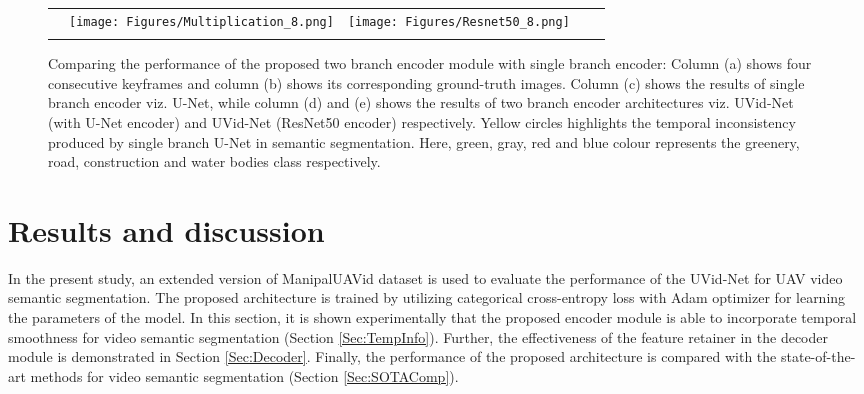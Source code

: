 \documentclass[journal]{IEEEtran}
\begin{document}
\begin{figure*}[!t]
\begin{tabular}{ccccc}
		&
		\hspace{1.4cm}
		\begin{minipage}{40pt}
			\texttt{[image: Figures/Multiplication\_8.png]}
			\centering{(d)}
		\end{minipage}
		&
		\hspace{1.4cm}
		\begin{minipage}{40pt}
			\texttt{[image: Figures/Resnet50\_8.png]}
			\centering{(e)}
		\end{minipage}
		\\
		\\
		
	\end{tabular}
	\caption{Comparing the performance of the proposed two branch encoder module with single branch encoder: Column (a) shows four consecutive keyframes and column (b) shows its corresponding ground-truth images. Column (c) shows the results of single branch encoder viz. U-Net, while column (d) and (e) shows the results of two branch encoder architectures viz. UVid-Net (with U-Net encoder) and UVid-Net (ResNet50 encoder) respectively. Yellow circles highlights the temporal inconsistency produced by single branch U-Net in semantic segmentation.  Here, green, gray, red and blue  colour represents the greenery, road, construction and water bodies class respectively. }
	\label{fig:temporal}
	
\end{figure*}




\section{Results and discussion}
\label{Sec: results}


\par In the present study, an extended version of ManipalUAVid \cite{19} dataset is used to evaluate the performance of the UVid-Net for UAV video semantic segmentation. The proposed architecture is trained by utilizing categorical cross-entropy loss with Adam optimizer for learning the parameters of the model.  In this section, it is shown experimentally that the proposed encoder module is able to incorporate temporal smoothness for video semantic segmentation (Section \ref{Sec:TempInfo}). Further, the effectiveness of the feature retainer in the decoder module is demonstrated in Section \ref{Sec:Decoder}. Finally, the performance of the proposed architecture is compared with the state-of-the-art methods for video semantic segmentation (Section \ref{Sec:SOTAComp}). 
\end{document}
